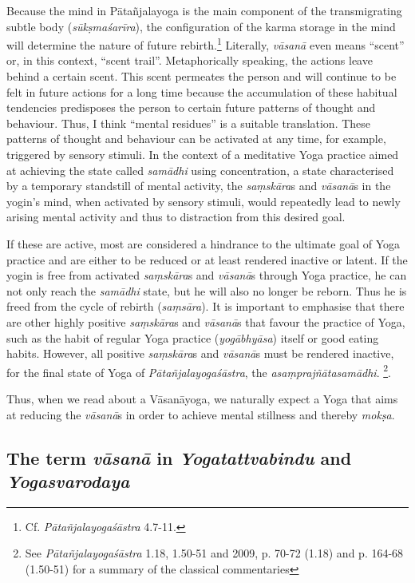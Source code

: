 Because the mind in Pātañjalayoga is the main component of the transmigrating subtle body (\textit{sūkṣmaśarīra}), the configuration of the karma storage in the mind will determine the nature of future rebirth.\footnote{Cf. \textit{Pātañjalayogaśāstra} 4.7-11.} Literally, \textit{vāsanā} even means ``scent'' or, in this context, ``scent trail''. Metaphorically speaking, the actions leave behind a certain scent. This scent permeates the person and will continue to be felt in future actions for a long time because the accumulation of these habitual tendencies predisposes the person to certain future patterns of thought and behaviour. Thus, I think ``mental residues'' is a suitable translation. These patterns of thought and behaviour can be activated at any time, for example, triggered by sensory stimuli. In the context of a meditative Yoga practice aimed at achieving the state called \textit{samādhi} using concentration, a state characterised by a temporary standstill of mental activity, the \textit{saṃskāra}s and \textit{vāsanā}s in the yogin's mind, when activated by sensory stimuli, would repeatedly lead to newly arising mental activity and thus to distraction from this desired goal.

If these are active, most are considered a hindrance to the ultimate goal of Yoga practice and are either to be reduced or at least rendered inactive or latent. If the yogin is free from activated \textit{saṃskāra}s and \textit{vāsanā}s through Yoga practice, he can not only reach the \textit{samādhi} state, but he will also no longer be reborn. Thus he is freed from the cycle of rebirth (\textit{saṃsāra}). It is important to emphasise that there are other highly positive \textit{saṃskāra}s and \textit{vāsanā}s that favour the practice of Yoga, such as the habit of regular Yoga practice (\textit{yogābhyāsa}) itself or good eating habits. However, all positive \textit{saṃskāra}s and \textit{vāsanā}s must be rendered inactive, for the final state of Yoga of \textit{Pātañjalayogaśāstra}, the \textit{asaṃprajñātasamādhi}. \footnote{See \textit{Pātañjalayogaśāstra} 1.18, 1.50-51 and \citeauthor{bryant2009} 2009, p. 70-72 (1.18) and p. 164-68 (1.50-51) for a summary of the classical commentaries}.  

Thus, when we read about a Vāsanāyoga, we naturally expect a Yoga that aims at reducing the \textit{vāsanā}s in order to achieve mental stillness and thereby \textit{mokṣa}.

\subsection{The term \textit{vāsanā} in \textit{Yogatattvabindu} and \textit{Yogasvarodaya}}

